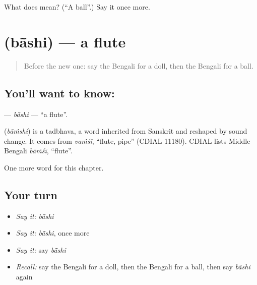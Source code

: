 \begin{tcolorbox}[breakable,colback=teal!4,colframe=teal!35!black,title={Before you move on}]
What does  mean? (\textquotedblleft{}A ball\textquotedblright{}.) Say it once more.
\end{tcolorbox}
\section[\texorpdfstring{\bn{বাঁশি} (bā̃shi)}{বাঁশি (bā̃shi)}]{ (bā̃shi) — a flute}

\label{lesson:BN-C131-bashi}



\begin{quote}
Before the new one: say the Bengali for a doll, then the Bengali for a ball.
\end{quote}

\subsection*{You'll want to know: }
\textbf{} — \emph{bā̃shi} — \textquotedblleft{}a flute\textquotedblright{}.

\begin{cousinweb}
\textbf{} (\emph{bāṁshi}) is a tadbhava, a word inherited from Sanskrit and reshaped by sound change. It comes from \emph{vaṁśī}, \textquotedblleft{}flute, pipe\textquotedblright{} (CDIAL 11180). CDIAL lists Middle Bengali \emph{bāṁśī}, \textquotedblleft{}flute\textquotedblright{}.
\end{cousinweb}

\begin{grammarlens}[title={What you've built}]
One more word for this chapter.
\end{grammarlens}

\subsection*{Your turn}
\begin{itemize}
\raggedright
  \item \emph{Say it:} \emph{bā̃shi}
  \item \emph{Say it:} \emph{bā̃shi}, once more
  \item \emph{Say it:} say \emph{bā̃shi}
  \item \emph{Recall:} say the Bengali for a doll, then the Bengali for a ball, then say \emph{bā̃shi} again
\end{itemize}


